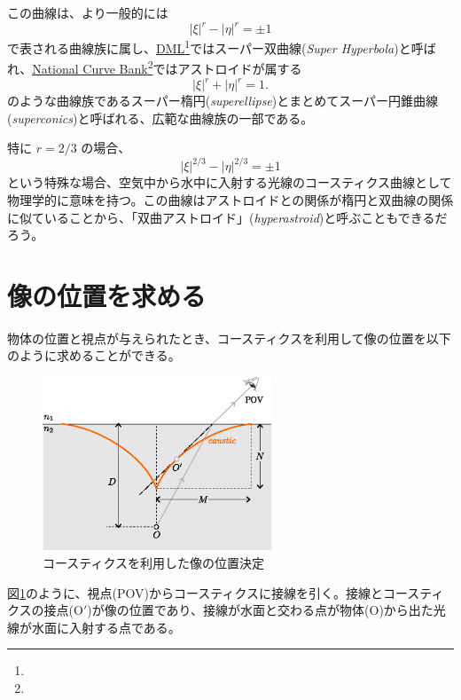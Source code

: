 \documentclass[twocolumn]{article}
\begin{document}
この曲線は、より一般的には
$$ \left| \xi \right|^{r} - \left| \eta \right|^{r} = \pm1 $$
で表される曲線族に属し、\href{http://dynamicmathematicslearning.com/super-ellipse.html}{DML}\footnote{}ではスーパー双曲線(\emph{Super Hyperbola})と呼ばれ、\href{https://old.nationalcurvebank.org/superconicncb/superconicncb.htm}{National Curve Bank}\footnote{}ではアストロイドが属する
$$ \left| \xi \right|^{r} + \left| \eta \right|^{r} = 1. $$
のような曲線族であるスーパー楕円(\emph{superellipse})とまとめてスーパー円錐曲線(\emph{superconics})と呼ばれる、広範な曲線族の一部である。

特に $r = 2/3$ の場合、
$$ \left| \xi \right|^{2/3} - \left| \eta \right|^{2/3} = \pm1 $$
という特殊な場合、空気中から水中に入射する光線のコースティクス曲線として物理学的に意味を持つ。この曲線はアストロイドとの関係が楕円と双曲線の関係に似ていることから、「双曲アストロイド」(\emph{hyperastroid})と呼ぶこともできるだろう。
	
\section{像の位置を求める}

物体の位置と視点が与えられたとき、コースティクスを利用して像の位置を以下のように求めることができる。

\begin{figure}[!h]
	\centering
	\includegraphics[width=2.7in]{figs/g394.eps}
	\caption{コースティクスを利用した像の位置決定}
	\label{fig:image_caustic}
\end{figure}

図\ref{fig:image_caustic}のように、視点(POV)からコースティクスに接線を引く。接線とコースティクスの接点($\mathrm{O'}$)が像の位置であり、接線が水面と交わる点が物体($\mathrm{O}$)から出た光線が水面に入射する点である。
\end{document}
